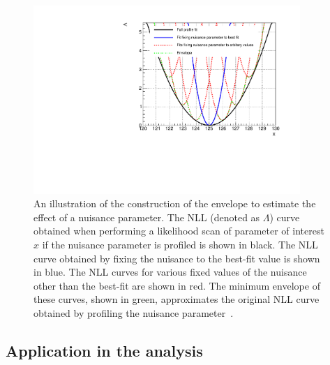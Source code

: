 \begin{figure}[ht!]
\centering
\includegraphics[width=0.9\textwidth]{modellingFigures/envelope_cartoon.pdf} 
\caption{An illustration of the construction of the envelope to estimate the effect of a nuisance parameter. The NLL (denoted as $\Lambda$) curve obtained when performing a likelihood scan of parameter of interest $x$ if the nuisance parameter is profiled is shown in black. The NLL curve obtained by fixing the nuisance to the best-fit value is shown in blue. The NLL curves for various fixed values of the nuisance other than the best-fit are shown in red. The minimum envelope of these curves, shown in green, approximates the original NLL curve obtained by profiling the nuisance parameter~\cite{DiscreteProfiling}.}

\label{fig:model:bkg_envelope}
\end{figure}

\subsection{Application in the \Hgg analysis}

